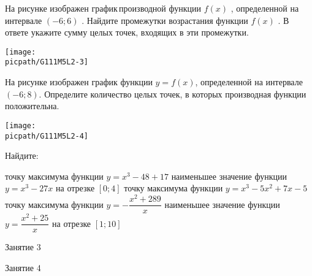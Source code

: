 \begin{class}[number=2]
\begin{listofex}
		\item
		\begin{minipage}[t]{\bodywidth}
			На рисунке изображен график производной функции \(f(x)\) , определенной на интервале \( (-6;6) \) . Найдите промежутки возрастания функции \(f(x)\) . В ответе укажите сумму целых точек, входящих в эти промежутки.
		\end{minipage}
		\hspace{0.02\linewidth}
		\begin{minipage}[t]{\picwidth}
			\texttt{[image: \\picpath/G111M5L2-3]}
		\end{minipage}
		\item
		\begin{minipage}[t]{\bodywidth}
			На рисунке изображен график функции \(y = f(x)\), определенной на интервале \((-6; 8)\). Определите количество целых точек, в которых производная функции положительна.
		\end{minipage}
		\hspace{0.02\linewidth}
		\begin{minipage}[t]{\picwidth}
			\texttt{[image: \\picpath/G111M5L2-4]}
		\end{minipage}
		\item Найдите:
		\begin{itasks}[1]
			\task точку максимума функции \(y = x^3 - 48 + 17\)
			\task наименьшее значение функции \(y = x^3 - 27x\) на отрезке \([0;4]\)
			\task точку максимума функции \(y = x^3 - 5x^2 + 7x -5\)
			\task точку максимума функции \(y = -\dfrac{x^2+289}{x}\)
			\task наименьшее значение функции \(y = \dfrac{x^2+25}{x}\) на отрезке \([1;10]\)
		\end{itasks}
	\end{listofex}
\end{class}

\begin{class}[number=3]
	\begin{listofex}
		\item Занятие 3
	\end{listofex}
\end{class}

\begin{class}[number=4]
	\begin{listofex}
		\item Занятие 4
	\end{listofex}
\end{class}

